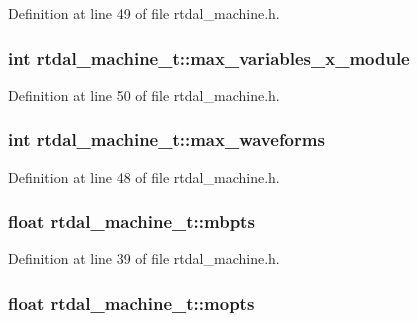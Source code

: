 Definition at line 49 of file rtdal\-\_\-machine.\-h.

\subsubsection[{max\-\_\-variables\-\_\-x\-\_\-module}]{\setlength{\rightskip}{0pt plus 5cm}int rtdal\-\_\-machine\-\_\-t\-::max\-\_\-variables\-\_\-x\-\_\-module}\label{structrtdal__machine__t_a98e1bf5ec3f8f2ad275f6783a8ee4df0}


Definition at line 50 of file rtdal\-\_\-machine.\-h.

\subsubsection[{max\-\_\-waveforms}]{\setlength{\rightskip}{0pt plus 5cm}int rtdal\-\_\-machine\-\_\-t\-::max\-\_\-waveforms}\label{structrtdal__machine__t_a1603a33417a4f3f624aa59074d18348a}


Definition at line 48 of file rtdal\-\_\-machine.\-h.

\subsubsection[{mbpts}]{\setlength{\rightskip}{0pt plus 5cm}float rtdal\-\_\-machine\-\_\-t\-::mbpts}\label{structrtdal__machine__t_a6414f7323760791df8a76ec90fcd5582}


Definition at line 39 of file rtdal\-\_\-machine.\-h.

\subsubsection[{mopts}]{\setlength{\rightskip}{0pt plus 5cm}float rtdal\-\_\-machine\-\_\-t\-::mopts}\label{structrtdal__machine__t_ac62f1bb089d649bb9cf5ad2d1c2e9d50}



